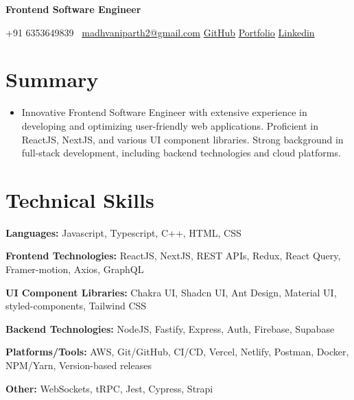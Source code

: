 \documentclass[11pt,a4paper,sans]{moderncv}
\begin{document}
\makecvtitle
\vspace*{-16mm}
\begin{center}\textbf{ Frontend Software Engineer }\end{center}

\begin{center}
{+91 6353649839}~ \quad \href{mailto:madhvaniparth2@gmail.com}{madhvaniparth2@gmail.com} \quad
\href{https://github.com/ParthMadhvani2}{\color{blue}GitHub} \quad
\href{https://parthmadhvani2.github.io/MyPortfolio/}{\color{blue}Portfolio}  \quad
\href{https://www.linkedin.com/in/parthmadhvani2/}{\color{blue}Linkedin}
\end{center}


\section{Summary}
\begin{itemize}[leftmargin=0in, label={}]
\item Innovative Frontend Software Engineer with extensive experience in developing and optimizing user-friendly web applications. Proficient in ReactJS, NextJS, and various UI component libraries. Strong background in full-stack development, including backend technologies and cloud platforms.
\end{itemize}

\section{Technical Skills}
\begin{itemize}[leftmargin=0in, label={}]
\normalsize{
    \item \textbf{Languages:} Javascript, Typescript, C++, HTML, CSS
    \item \textbf{Frontend Technologies:} ReactJS, NextJS, REST APIs, Redux, React Query, Framer-motion, Axios, GraphQL
    \item \textbf{UI Component Libraries:} Chakra UI, Shadcn UI, Ant Design, Material UI, styled-components, Tailwind CSS
    \item \textbf{Backend Technologies:} NodeJS, Fastify, Express, Auth, Firebase, Supabase
    \item \textbf{Platforms/Tools:} AWS, Git/GitHub, CI/CD, Vercel, Netlify, Postman, Docker, NPM/Yarn, Version-based releases
    \item \textbf{Other:} WebSockets, tRPC, Jest, Cypress, Strapi
}
\end{itemize}
\end{document}

